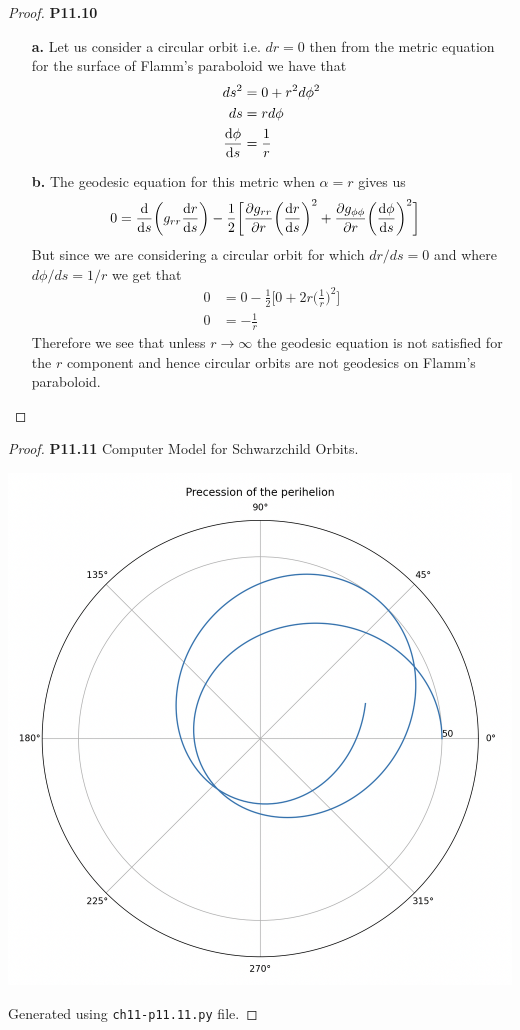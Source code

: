 \documentclass[11pt]{article}
\theoremstyle{definition}
\begin{document}
\begin{proof}{\textbf{P11.10}}
\begin{itemize}
    \item [\textbf{a.}] Let us consider a circular orbit i.e. $dr = 0 $ then
    from the metric equation for the surface of Flamm's paraboloid we have that
    \begin{align*}
        ds^2 &= 0 + r^2 d\phi^2\\
        ds &= r d\phi\\
        \dv{\phi}{s} &= \frac{1}{r}
    \end{align*}
    \item [\textbf{b.}] The geodesic equation for this metric when $\alpha = r$
    gives us
    \begin{align*}
        0 &= \dv{s}(g_{rr}\dv{r}{s}) - \frac{1}{2}\bigg[
            \pdv{g_{rr}}{r}\bigg(\dv{r}{s}\bigg)^2
            + \pdv{g_{\phi\phi}}{r}\bigg(\dv{\phi}{s}\bigg)^2 
        \bigg]
    \end{align*}
    But since we are considering a circular orbit for which $dr/ds = 0$
    and where $d\phi/ds = 1/r$ we get that
    \begin{align*}
        0 &= 0 - \frac{1}{2}\bigg[0 + 2r\bigg(\frac{1}{r}\bigg)^2\bigg]\\
        0 &= -\frac{1}{r}
    \end{align*}
    Therefore we see that unless $r \to \infty$ the geodesic equation is not
    satisfied for the $r$ component and hence circular orbits are not geodesics
    on Flamm's paraboloid.
\end{itemize}
\end{proof}
\cleardoublepage
\begin{proof}{\textbf{P11.11}}
    Computer Model for Schwarzchild Orbits.
    \begin{center}
        \includegraphics[scale=0.4]{ch11-p11.11.png}
    \end{center}
    Generated using \verb|ch11-p11.11.py| file.
\end{proof}
\end{document}
